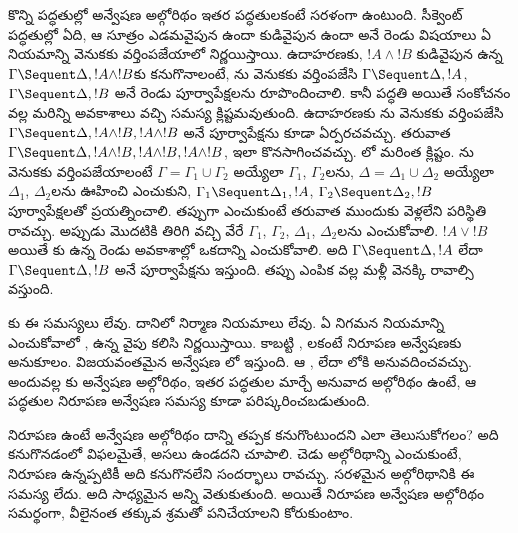 \documentclass[../../../include/open-logic-section]{subfiles}
\begin{document}
కొన్ని  పద్ధతుల్లో అన్వేషణ అల్గోరిథం ఇతర పద్ధతులకంటే సరళంగా ఉంటుంది. సీక్వెంట్ పద్ధతుల్లో   ఏది, ఆ సూత్రం ఎడమవైపున ఉందా కుడివైపున ఉందా అనే రెండు విషయాలు ఏ నియమాన్ని వెనుకకు వర్తింపజేయాలో నిర్ణయిస్తాయి. ఉదాహరణకు, $!A \land
!B$ కుడివైపున ఉన్న $\Gamma \Sequent \Delta, !A \land !B$కు  కనుగొనాలంటే, \RightR{\land}ను వెనుకకు వర్తింపజేసి $\Gamma \Sequent \Delta, !A$, $\Gamma \Sequent \Delta, !B$ అనే రెండు పూర్వాపేక్షలను రూపొందించాలి. కానీ పద్ధతి  అయితే సంకోచనం వల్ల మరిన్ని అవకాశాలు వచ్చి సమస్య క్లిష్టమవుతుంది. ఉదాహరణకు \RightR{\Contraction}ను వెనుకకు వర్తింపజేసి $\Gamma \Sequent \Delta, !A \land
!B, !A \land !B$ అనే పూర్వాపేక్షను కూడా ఏర్పరచవచ్చు. తరువాత $\Gamma \Sequent
\Delta, !A \land !B, !A \land !B, !A \land !B$, ఇలా కొనసాగించవచ్చు. లో మరింత క్లిష్టం. \RightR{\land}ను వెనుకకు వర్తింపజేయాలంటే $\Gamma
= \Gamma_1 \cup \Gamma_2$ అయ్యేలా $\Gamma_1$, $\Gamma_2$లను, $\Delta
= \Delta_1 \cup \Delta_2$ అయ్యేలా $\Delta_1$, $\Delta_2$లను ఊహించి ఎంచుకుని, $\Gamma_1 \Sequent \Delta_1, !A$, $\Gamma_2 \Sequent \Delta_2, !B$ పూర్వాపేక్షలతో ప్రయత్నించాలి. తప్పుగా ఎంచుకుంటే తరువాత ముందుకు వెళ్లలేని పరిస్థితి రావచ్చు. అప్పుడు మొదటికి తిరిగి వచ్చి వేరే $\Gamma_1$, $\Gamma_2$, $\Delta_1$, $\Delta_2$లను ఎంచుకోవాలి.  $!A \lor !B$ అయితే \RightR{\lor}కు ఉన్న రెండు అవకాశాల్లో ఒకదాన్ని ఎంచుకోవాలి. అది $\Gamma \Sequent \Delta,
!A$ లేదా $\Gamma \Sequent \Delta, !B$ అనే పూర్వాపేక్షను ఇస్తుంది. తప్పు ఎంపిక వల్ల మళ్లీ వెనక్కి రావాల్సి వస్తుంది.

కు ఈ సమస్యలు లేవు. దానిలో నిర్మాణ నియమాలు లేవు. ఏ నిగమన నియమాన్ని ఎంచుకోవాలో ,  ఉన్న వైపు కలిసి నిర్ణయిస్తాయి. కాబట్టి , లకంటే  నిరూపణ అన్వేషణకు అనుకూలం. విజయవంతమైన అన్వేషణ లో  ఇస్తుంది. ఆ  ,  లేదా లోకి అనువదించవచ్చు. అందువల్ల కు అన్వేషణ అల్గోరిథం,   ఇతర పద్ధతుల  మార్చే అనువాద అల్గోరిథం ఉంటే, ఆ పద్ధతుల నిరూపణ అన్వేషణ సమస్య కూడా పరిష్కరించబడుతుంది.

నిరూపణ ఉంటే అన్వేషణ అల్గోరిథం దాన్ని తప్పక కనుగొంటుందని ఎలా తెలుసుకోగలం? అది  కనుగొనడంలో విఫలమైతే,  అసలు ఉండదని చూపాలి. చెడు అల్గోరిథాన్ని ఎంచుకుంటే, నిరూపణ ఉన్నప్పటికీ అది కనుగొనలేని సందర్భాలు రావచ్చు. సరళమైన అల్గోరిథానికి ఈ సమస్య లేదు. అది సాధ్యమైన అన్ని  వెతుకుతుంది. అయితే నిరూపణ అన్వేషణ అల్గోరిథం సమర్థంగా, వీలైనంత తక్కువ శ్రమతో పనిచేయాలని కోరుకుంటాం.
\end{document}
